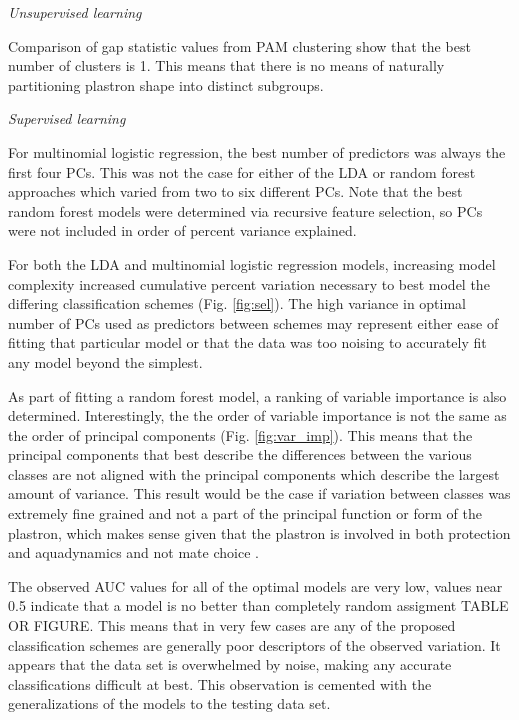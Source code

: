 \documentclass[12pt,letterpaper]{article}
\renewcommand{\subsection}[1]{%
\bigskip
\begin{center}
\begin{large}
\normalfont\itshape #1
\end{large}
\end{center}}
\begin{document}
\subsection{Unsupervised learning}
Comparison of gap statistic values from PAM clustering show that the best number of clusters is 1. This means that there is no means of naturally partitioning plastron shape into distinct subgroups.

\subsection{Supervised learning}
For multinomial logistic regression, the best number of predictors was always the first four PCs. This was not the case for either of the LDA or random forest approaches which varied from two to six different PCs. Note that the best random forest models were determined via recursive feature selection, so PCs were not included in order of percent variance explained.


For both the LDA and multinomial logistic regression models, increasing model complexity increased cumulative percent variation necessary to best model the differing classification schemes (Fig. \ref{fig:sel}). The high variance in optimal number of PCs used as predictors between schemes may represent either ease of fitting that particular model or that the data was too noising to accurately fit any model beyond the simplest. 

As part of fitting a random forest model, a ranking of variable importance is also determined. Interestingly, the the order of variable importance is not the same as the order of principal components (Fig. \ref{fig:var_imp}). This means that the principal components that best describe the differences between the various classes are not aligned with the principal components which describe the largest amount of variance. This result would be the case if variation between classes was extremely fine grained and not a part of the principal function or form of the plastron, which makes sense given that the plastron is involved in both protection and aquadynamics and not mate choice \citep{Germano2009,Holland1992,Lubcke2007,Rivera2008}.


The observed AUC values for all of the optimal models are very low, values near 0.5 indicate that a model is no better than completely random assigment TABLE OR FIGURE. This means that in very few cases are any of the proposed classification schemes are generally poor descriptors of the observed variation. It appears that the data set is overwhelmed by noise, making any accurate classifications difficult at best. This observation is cemented with the generalizations of the models to the testing data set.
\end{document}
